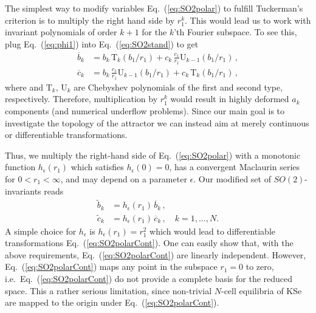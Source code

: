 \documentclass[aip,cha,showpacs,reprint]{revtex4-1} %
\newcommand{\bseq}{\begin{subequations}}
\newcommand{\eseq}{\end{subequations}}
\newcommand{\refeq}  [1] {Eq.~(\ref{#1})}                   %
\newcommand{\ie}{{i.e.}}
\newcommand{\chebT}{\mathrm{T}}
\newcommand{\chebU}{\mathrm{U}}
\begin{document}
The simplest way to modify variables \refeq{eq:SO2polar} to fulfill Tuckerman's
criterion is to multiply the right hand side by $r_1^k$. This would lead us to
work with invariant polynomials of order $k+1$ for the $k$'th Fourier subspace.
To see this, plug \refeq{eq:phi1} into \refeq{eq:SO2stand} to get
\bseq\label{eq:SO2cheb}
  \begin{align}
    \overline{b}_k &=
		    b_k\, \chebT_k\left(b_1/r_1\right)+
		    c_k\,\frac{c_1}{r_1} \chebU_{k-1}\left(b_1/r_1\right)\,, \label{eq:SO2cheb1}\\
    \overline{c}_k &=
		    b_k\, \frac{c_1}{r_1} \chebU_{k-1}\left(b_1/r_1\right)+
		    c_k\,\chebT_k\left(b_1/r_1\right)\,,  \label{eq:SO2cheb2}
  \end{align}
\eseq
where and $\chebT_k,\,\chebU_k$ are Chebyshev polynomials of the first and second type, respectively.
Therefore, multiplication by $r_1^k$ would result in highly deformed $a_k$ components
(and numerical underflow problems). Since our main goal is to investigate the
topology of the attractor we can instead aim at merely continuous or
differentiable transformations.

Thus, we multiply the right-hand side of \refeq{eq:SO2polar} with a monotonic function
$h_\epsilon(r_1)$ which satisfies $h_\epsilon(0)=0$,
has a convergent Maclaurin series for $0<r_1<\infty$,
and may depend on a parameter $\epsilon$.
Our modified set of $SO(2)$-invariants reads
\bseq\label{eq:SO2polarCont}
  \begin{align}
    \tilde{b}_k &=
		    h_\epsilon(r_1)\,\overline{b}_k\,, \label{eq:SO2polarCont1}\\
    \tilde{c}_k &=
		    h_\epsilon(r_1)\,\overline{c}_k\,, \quad k=1,\ldots,N.\label{eq:SO2polarCont2}
  \end{align}
\eseq
A simple choice for $h_\epsilon$ is
$h_\epsilon(r_1)=r_1^2$ which would lead to differentiable transformations \refeq{eq:SO2polarCont}.
One can easily show that, with the above requirements,
\refeq{eq:SO2polarCont} are linearly independent. However,
\refeq{eq:SO2polarCont} maps any point in the subspace $r_1=0$ to zero, \ie\
\refeq{eq:SO2polarCont} do not provide a complete basis for the reduced space.
This a rather serious limitation, since non-trivial $N$-cell equilibria of
KSe are mapped to the origin under \refeq{eq:SO2polarCont}.
\end{document}
